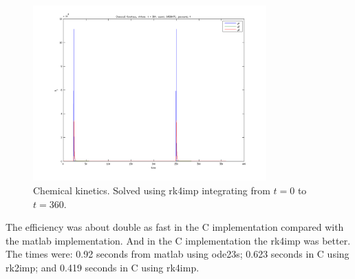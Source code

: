 \begin{figure}[h!]
	\centering
	\includegraphics[width=0.8\textwidth]{img/exc2_4_360}
	\caption{Chemical kinetics. Solved using rk4imp integrating from $t=0$ to $t=360$.}
	\label{fig:exc2_4_360}
\end{figure}

The efficiency was about double as fast in the C implementation compared with the matlab implementation. And in the C implementation the rk4imp was better.
The times were: 0.92 seconds from matlab using ode23s; 0.623 seconds in C using rk2imp; 
and 0.419 seconds in C using rk4imp.